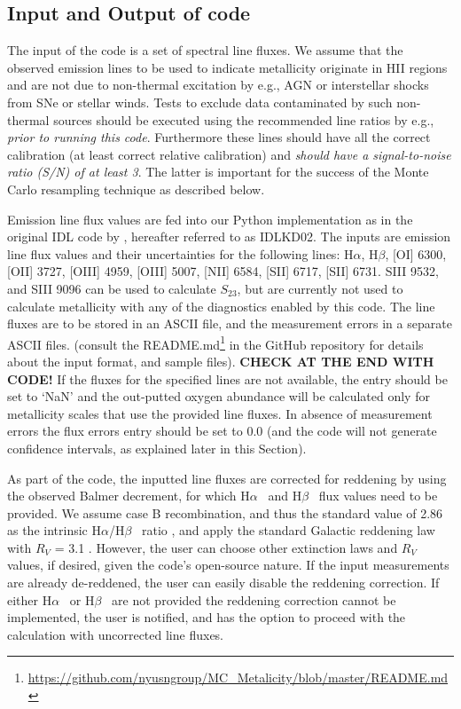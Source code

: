 \documentclass{emulateapj}
\newcommand{\ha}{H$\alpha$}
\newcommand{\hb}{H$\beta$}
\begin{document}
\subsection{Input and Output of code}

The input of the code is a set of spectral line fluxes. We assume that the observed emission lines to be used to indicate metallicity originate in HII regions and are not due to non-thermal excitation by e.g., AGN or interstellar shocks from SNe or stellar winds.  Tests to exclude data contaminated by such non-thermal sources should be executed using the recommended line ratios by e.g., \citealt{baldwin81,kauffmann03,kewley06_sdss} \emph{prior to running this code}. Furthermore these lines should have all the correct calibration (at least correct relative calibration) and \emph{should have a signal-to-noise ratio (S/N) of at least 3}. The latter is important for the success of the Monte Carlo resampling technique as described below.

Emission line flux values are fed into our Python implementation as in the original IDL code by \citet{kewley02}, hereafter referred to as IDLKD02. The inputs are emission line flux values and their uncertainties for the following lines: \ha, \hb, [OI] 6300, [OII] 3727, [OIII] 4959, [OIII] 5007, [NII] 6584, [SII] 6717, [SII] 6731.  SIII 9532, and SIII 9096 can be used to calculate $S_{23}$, but are currently not used to calculate metallicity with any of the diagnostics enabled by this code. The line fluxes are to be stored in an ASCII file, and the measurement errors in a separate ASCII files.
(consult the README.md\footnote{\url{https://github.com/nyusngroup/MC_Metalicity/blob/master/README.md}} in the GitHub repository for details about the input format, and sample files). \textbf{CHECK AT THE END WITH CODE!} 
 If the fluxes for the specified lines are not available, the entry should be set to `NaN' and the out-putted oxygen abundance will be calculated only for metallicity scales that use the provided line fluxes. In absence of measurement errors the flux errors entry should be set to 0.0 (and the code will not generate confidence intervals, as explained later in this Section).

As part of the code, the inputted line fluxes are corrected for reddening by using the observed Balmer decrement, for which \ha~ and  \hb~ flux values need to be provided. We assume case B recombination, and thus the standard value of 2.86 as the
intrinsic \ha/\hb~ ratio \citep{osterbrock89}, and apply the standard Galactic reddening law with $R_V$ = 3.1 \citep{cardelli89}. However, the user can choose other extinction laws and $R_V$ values, if desired, given the code's open-source nature. If the input measurements are already de-reddened, the user can easily disable the reddening correction. If either \ha~ or \hb~ are not provided the reddening correction cannot be implemented, the user is notified, and has the option to proceed with the calculation with uncorrected line fluxes.
\end{document}
